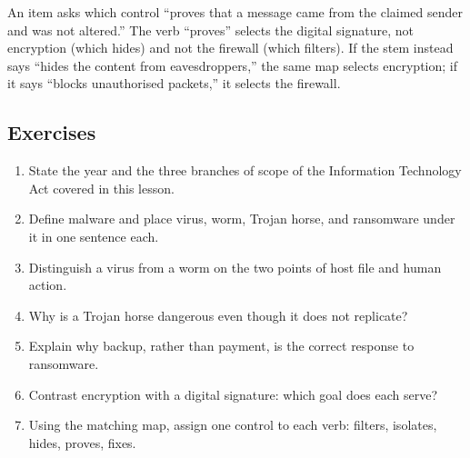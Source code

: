 \begin{example}
An item asks which control ``proves that a message came from the claimed
sender and was not altered.'' The verb ``proves'' selects the digital
signature, not encryption (which hides) and not the firewall (which
filters). If the stem instead says ``hides the content from
eavesdroppers,'' the same map selects encryption; if it says ``blocks
unauthorised packets,'' it selects the firewall.
\end{example}

\subsection*{Exercises}
\begin{enumerate}[label=\arabic*.]
  \item State the year and the three branches of scope of the Information
    Technology Act covered in this lesson.
  \item Define malware and place virus, worm, Trojan horse, and ransomware
    under it in one sentence each.
  \item Distinguish a virus from a worm on the two points of host file and
    human action.
  \item Why is a Trojan horse dangerous even though it does not replicate?
  \item Explain why backup, rather than payment, is the correct response to
    ransomware.
  \item Contrast encryption with a digital signature: which goal does each
    serve?
  \item Using the matching map, assign one control to each verb: filters,
    isolates, hides, proves, fixes.
\end{enumerate}

